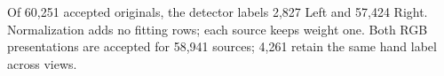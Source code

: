 Of 60,251 accepted originals, the detector labels 2,827 Left and 57,424 Right. Normalization adds no fitting rows; each source keeps weight one. Both RGB presentations are accepted for 58,941 sources; 4,261 retain the same hand label across views.
